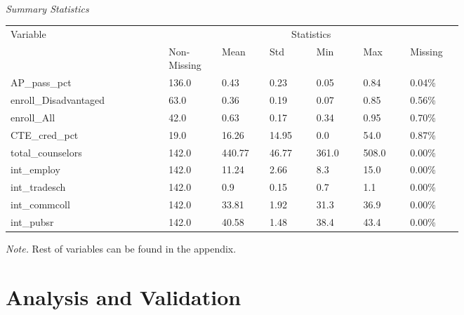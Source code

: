 \documentclass[10pt]{beamer}
\begin{document}
\begin{frame}
    \begin{threeparttable}
        \caption{\\\textit{Summary Statistics}}
        \begin{tabular}{ p{0.27\linewidth} p{0.08\linewidth} p{0.08\linewidth} p{0.08\linewidth} p{0.08\linewidth} p{0.08\linewidth} p{0.08\linewidth}}
            \toprule
            Variable & \multicolumn{6}{c}{Statistics} \\
            \cmidrule(r){2-7}
            &    Non-Missing   &   Mean & Std & Min & Max & Missing  \\ 
            \midrule
            AP\_pass\_pct &  136.0  &  0.43 & 0.23 & 0.05 & 0.84 & 0.04\%  \\ 
            enroll\_Disadvantaged &  63.0  &  0.36 & 0.19 & 0.07 & 0.85 & 0.56\%   \\
            enroll\_All &  42.0  &  0.63 & 0.17 & 0.34 & 0.95 & 0.70\%  \\
            CTE\_cred\_pct &  19.0  &  16.26 & 14.95 & 0.0 & 54.0 & 0.87\%  \\ 
            total\_counselors &  142.0  &  440.77 & 46.77 & 361.0 & 508.0 & 0.00\% \\
            int\_employ &  142.0  &  11.24 & 2.66 & 8.3 & 15.0 & 0.00\%  \\
            int\_tradesch &  142.0  &  0.9 & 0.15 & 0.7 & 1.1 & 0.00\%  \\ 
            int\_commcoll &  142.0  &  33.81 & 1.92 & 31.3 & 36.9 & 0.00\% \\
            int\_pubsr &  142.0  &  40.58 & 1.48 & 38.4 & 43.4 & 0.00\%  \\
            \midrule
        \end{tabular}
        \small \emph{Note.} Rest of variables can be found in the appendix.
        \end{threeparttable}
\end{frame}

\section{Analysis and Validation}
\end{document}
